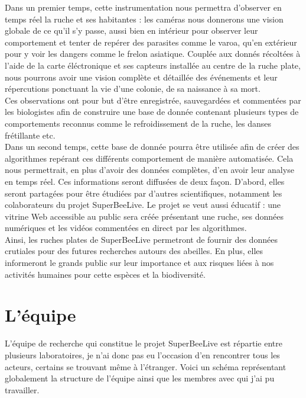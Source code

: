 \documentclass[11pt,french,a4paper]{report}
\begin{document}
Dans un premier temps, cette instrumentation nous permettra d'observer en temps réel la ruche et ses habitantes : 
les caméras nous donnerons une vision globale de ce qu'il s'y passe, aussi bien en intérieur pour observer leur 
comportement et tenter de repérer des parasites comme le varoa, qu'en extérieur pour y voir les dangers comme le frelon asiatique. %
Couplée aux donnés récoltées à l'aide de la carte éléctronique et ses capteurs installée au centre de la ruche plate, 
nous pourrons avoir une vision complète et détaillée des événements et leur répercutions ponctuant la vie d'une colonie,
de sa naissance à sa mort. \\
Ces observations ont pour but d'être enregistrée, sauvegardées et commentées par les biologistes afin de construire une base
de donnée contenant plusieurs types de comportements reconnus comme le refroidissement de la ruche, les danses frétillante etc. %
\\
Dans un second temps, cette base de donnée pourra être utilisée afin de créer des algorithmes repérant ces différents comportement
de manière automatisée. Cela nous permettrait, en plus d'avoir des données complètes, d'en avoir leur analyse en 
temps réel. Ces informations seront diffusées de deux façon. D'abord, elles seront partagées pour être étudiées par d'autres scientifiques, 
notamment les colaborateurs du projet SuperBeeLive. Le projet se veut aussi éducatif : une vitrine Web accessible au public 
sera créée présentant une ruche, ses données numériques et les vidéos commentées en direct par les algorithmes. \\


Ainsi, les ruches plates de SuperBeeLive permetront de fournir des données crutiales pour des futures recherches autours des 
abeilles. En plus, elles informeront le grands public sur leur importance et aux risques liées à nos activités humaines pour 
cette espèces et la biodiversité. 


\section{L'équipe}
L'équipe de recherche qui constitue le projet SuperBeeLive est répartie entre plusieurs laboratoires, je n'ai donc pas eu l'occasion
d'en rencontrer tous les acteurs, certains se trouvant même à l'étranger. Voici un schéma représentant globalement la structure
de l'équipe ainsi que les membres avec qui j'ai pu travailler. \\
\end{document}
